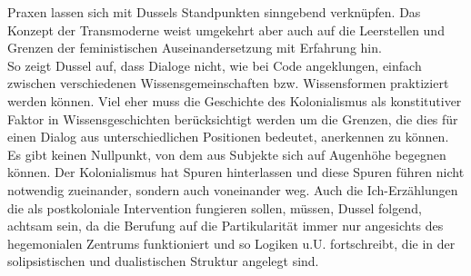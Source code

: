 \noindent Praxen lassen sich mit Dussels Standpunkten sinngebend verknüpfen. Das Konzept
der Transmoderne weist umgekehrt aber auch auf die Leerstellen und Grenzen der
feministischen Auseinandersetzung mit Erfahrung hin.\\
So zeigt Dussel auf, dass
Dialoge nicht, wie bei Code angeklungen, einfach zwischen verschiedenen
Wissensgemeinschaften bzw. Wissensformen praktiziert werden können. Viel eher
muss die Geschichte des Kolonialismus als konstitutiver Faktor in
Wissensgeschichten berücksichtigt werden um die Grenzen, die dies für einen
Dialog aus unterschiedlichen Positionen bedeutet, anerkennen zu können. Es gibt
keinen Nullpunkt, von dem aus Subjekte sich auf Augenhöhe begegnen können. Der
Kolonialismus hat Spuren hinterlassen und diese Spuren führen nicht notwendig
zueinander, sondern auch voneinander weg. Auch die Ich-Erzählungen die als
postkoloniale Intervention fungieren sollen, müssen, Dussel folgend, achtsam
sein, da die Berufung auf die Partikularität immer nur angesichts des
hegemonialen Zentrums funktioniert und so Logiken u.U. fortschreibt, die in der
solipsistischen und dualistischen Struktur angelegt sind.
